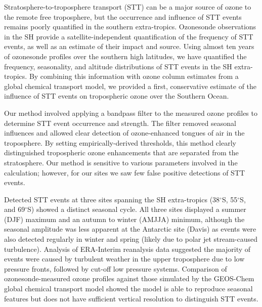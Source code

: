 \documentclass[acp, manuscript]{copernicus} %
\begin{document}
\conclusions  %
%
  
Stratosphere-to-troposphere transport (STT) can be a major source of ozone to the remote free troposphere, but the occurrence and influence of STT events remains poorly quantified in the southern extra-tropics.
Ozonesonde observations in the SH provide a satellite-independent quantification of the frequency of STT events, as well as an estimate of their impact and source.
Using almost ten years of ozonesonde profiles over the southern high latitudes, we have quantified the frequency, seasonality, and altitude distributions of STT events in the SH extra-tropics. 
By combining this information with ozone column estimates from a global chemical transport model, we provided a first, conservative estimate of the influence of STT events on tropospheric ozone over the Southern Ocean.

Our method involved applying a bandpass filter to the measured ozone profiles to determine STT event occurrence and strength.
The filter removed seasonal influences and allowed clear detection of ozone-enhanced tongues of air in the troposphere.
By setting empirically-derived thresholds, this method clearly distinguished tropospheric ozone enhancements that are separated from the stratosphere.
Our method is sensitive to various parameters involved in the calculation; however, for our sites we saw few false positive detections of STT events.

Detected STT events at three sites spanning the SH extra-tropics (38$^{\circ}$S, 55$^{\circ}$S, and 69$^{\circ}$S) showed a distinct seasonal cycle.
All three sites displayed a summer (DJF) maximum and an autumn to winter (AMJJA) minimum, although the seasonal amplitude was less apparent at the Antarctic site (Davis) as events were also detected regularly in winter and spring (likely due to polar jet stream-caused turbulence).
Analysis of ERA-Interim reanalysis data suggested the majority of events were caused by turbulent weather in the upper troposphere due to low pressure fronts, followed by cut-off low pressure systems.
Comparison of ozonesonde-measured ozone profiles against those simulated by the GEOS-Chem global chemical transport model showed the model is able to reproduce seasonal features but does not have sufficient vertical resolution to distinguish STT events.
\end{document}
